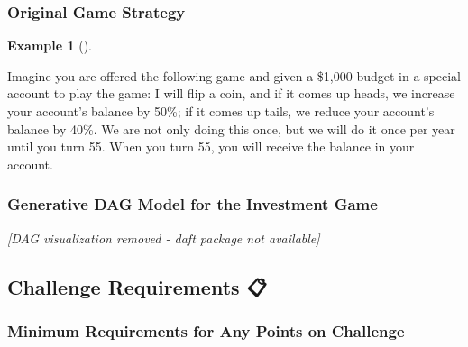 \documentclass[
  letterpaper,
  DIV=11,
  numbers=noendperiod]{scrartcl}
\theoremstyle{definition}
\newtheorem{example}{Example}[section]
\theoremstyle{remark}
\begin{document}
\subsubsection{Original Game Strategy}\label{original-game-strategy}

\begin{example}[]\protect\hypertarget{exm-ErgodicityEconomicsExample}{}\label{exm-ErgodicityEconomicsExample}

Imagine you are offered the following game and given a \$1,000 budget in
a special account to play the game: I will flip a coin, and if it comes
up heads, we increase your account's balance by 50\%; if it comes up
tails, we reduce your account's balance by 40\%. We are not only doing
this once, but we will do it once per year until you turn 55. When you
turn 55, you will receive the balance in your account.

\end{example}

\subsubsection{Generative DAG Model for the Investment
Game}\label{generative-dag-model-for-the-investment-game}

\emph{{[}DAG visualization removed - daft package not available{]}}

\subsection{Challenge Requirements 📋}\label{challenge-requirements}

\subsubsection{Minimum Requirements for Any Points on
Challenge}\label{minimum-requirements-for-any-points-on-challenge}
\end{document}
